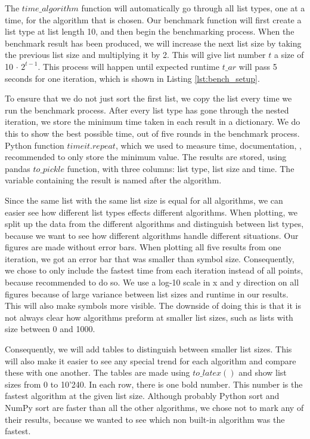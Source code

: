 \documentclass[sigconf, nonacm, natbib, screen, balance=False]{acmart}
\begin{document}
The $time\_algorithm$ function will automatically go through all list types, one at a time, for the algorithm that is chosen. Our benchmark function will first create a list type at list length 10, and then begin the benchmarking process. When the benchmark result has been produced, we will increase the next list size by taking the previous list size and multiplying it by 2. This will give list number $t$ a size of 10 $\cdot$ $2^{t-1}$. This process will happen until expected runtime $t\_ar$ will pass 5 seconds for one iteration, which is shown in Listing \ref{lst:bench_setup}.

To ensure that we do not just sort the first list, we copy the list every time we run the benchmark process. After every list type has gone through the nested iteration, we store the minimum time taken in each result in a dictionary. We do this to show the best possible time, out of five rounds in the benchmark process. Python function $timeit.repeat$, which we used to measure time, documentation, \citet{timeit}, recommended to only store the minimum value. 
The results are stored, using pandas $to\_pickle$ function, with three columns: list type, list size and time. The variable containing the result is named after the algorithm.

Since the same list with the same list size is equal for all algorithms, we can easier see how different list types effects different algorithms. When plotting, we split up the data from the different algorithms and distinguish between list types, because we want to see how different algorithms handle different situations. Our figures are made without error bars. When plotting all five results from one iteration, we got an error bar that was smaller than symbol size. Consequently, we chose to only include the fastest time from each iteration instead of all points, because \citet{timeit} recommended to do so. We use a log-10 scale in x and y direction on all figures because of large variance between list sizes and runtime in our results. This will also make symbols more visible. The downside of doing this is that it is not always clear how algorithms preform at smaller list sizes, such as lists with size between 0 and 1000. 

Consequently, we will add tables to distinguish between smaller list sizes. This will also make it easier to see any special trend for each algorithm and compare these with one another. The tables are made using $to\_latex()$ and show list sizes from 0 to 10’240. In each row, there is one bold number. This number is the fastest algorithm at the given list size. Although probably Python sort and NumPy sort are faster than all the other algorithms, we chose not to mark any of their results, because we wanted to see which non built-in algorithm was the fastest.
\end{document}
